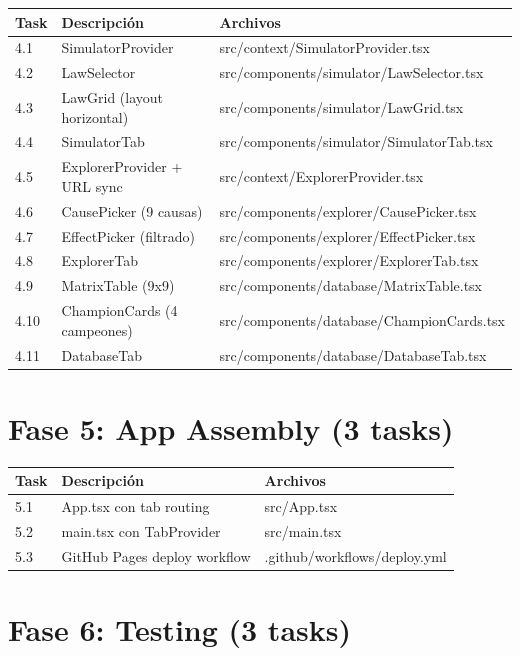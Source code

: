 \documentclass[11pt,a4paper]{report}
\begin{document}
\begin{table}[h]
\centering
\small
\begin{tabular}{@{}lll@{}}
\toprule
\textbf{Task} & \textbf{Descripción} & \textbf{Archivos} \\
\midrule
4.1 & SimulatorProvider & src/context/SimulatorProvider.tsx \\
4.2 & LawSelector & src/components/simulator/LawSelector.tsx \\
4.3 & LawGrid (layout horizontal) & src/components/simulator/LawGrid.tsx \\
4.4 & SimulatorTab & src/components/simulator/SimulatorTab.tsx \\
4.5 & ExplorerProvider + URL sync & src/context/ExplorerProvider.tsx \\
4.6 & CausePicker (9 causas) & src/components/explorer/CausePicker.tsx \\
4.7 & EffectPicker (filtrado) & src/components/explorer/EffectPicker.tsx \\
4.8 & ExplorerTab & src/components/explorer/ExplorerTab.tsx \\
4.9 & MatrixTable (9x9) & src/components/database/MatrixTable.tsx \\
4.10 & ChampionCards (4 campeones) & src/components/database/ChampionCards.tsx \\
4.11 & DatabaseTab & src/components/database/DatabaseTab.tsx \\
\bottomrule
\end{tabular}
\end{table}

\section{Fase 5: App Assembly (3 tasks)}

\begin{table}[h]
\centering
\small
\begin{tabular}{@{}lll@{}}
\toprule
\textbf{Task} & \textbf{Descripción} & \textbf{Archivos} \\
\midrule
5.1 & App.tsx con tab routing & src/App.tsx \\
5.2 & main.tsx con TabProvider & src/main.tsx \\
5.3 & GitHub Pages deploy workflow & .github/workflows/deploy.yml \\
\bottomrule
\end{tabular}
\end{table}

\section{Fase 6: Testing (3 tasks)}
\end{document}
